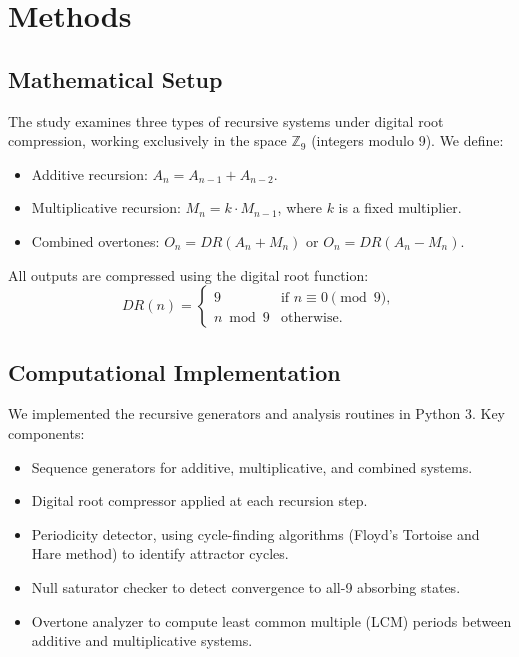 \documentclass[12pt]{article}
\begin{document}
\section{Methods}

\subsection{Mathematical Setup}

The study examines three types of recursive systems under digital root compression, working exclusively in the space \( \mathbb{Z}_9 \) (integers modulo 9).  
We define:
\begin{itemize}
    \item Additive recursion: \( A_n = A_{n-1} + A_{n-2} \).
    \item Multiplicative recursion: \( M_n = k \cdot M_{n-1} \), where \( k \) is a fixed multiplier.
    \item Combined overtones: \( O_n = DR(A_n + M_n) \) or \( O_n = DR(A_n - M_n) \).
\end{itemize}

All outputs are compressed using the digital root function:
\[
DR(n) =
\begin{cases}
9 & \text{if } n \equiv 0 \pmod{9}, \\
n \bmod 9 & \text{otherwise}.
\end{cases}
\]

\subsection{Computational Implementation}

We implemented the recursive generators and analysis routines in Python 3.  
Key components:
\begin{itemize}
    \item Sequence generators for additive, multiplicative, and combined systems.
    \item Digital root compressor applied at each recursion step.
    \item Periodicity detector, using cycle-finding algorithms (Floyd’s Tortoise and Hare method) to identify attractor cycles.
    \item Null saturator checker to detect convergence to all-9 absorbing states.
    \item Overtone analyzer to compute least common multiple (LCM) periods between additive and multiplicative systems.
\end{itemize}
\end{document}
